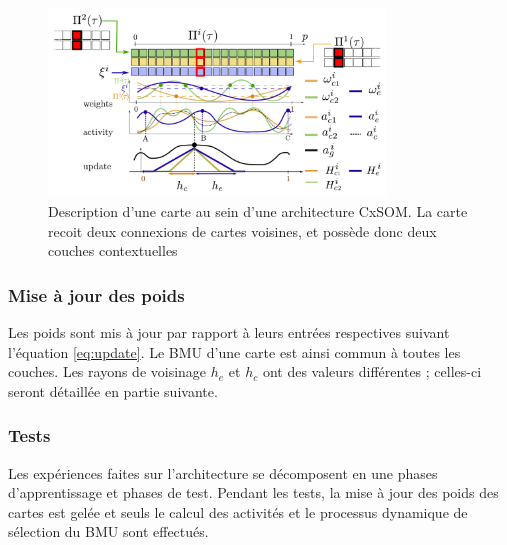 \begin{figure}
\centering
\includegraphics[width=0.8\textwidth]{one_map.pdf}
\caption{Description d'une carte au sein d'une architecture CxSOM. La carte recoit deux connexions de cartes voisines, et possède donc deux couches contextuelles}
\label{fig:one_map}
\end{figure}

\subsubsection{Mise à jour des poids}

Les poids sont mis à jour par rapport à leurs entrées respectives suivant l'équation \ref{eq:update}. Le BMU d'une carte est ainsi commun à toutes les couches. Les rayons de voisinage $h_e$ et $h_c$ ont des valeurs différentes ; celles-ci seront détaillée en partie suivante. 

\subsubsection{Tests}

Les expériences faites sur l'architecture se décomposent en une phases d'apprentissage et phases de test. Pendant les tests, la mise à jour des poids des cartes est gelée et seuls le calcul des activités et le processus dynamique de sélection du BMU sont effectués.

